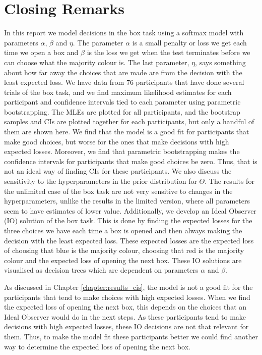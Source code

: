 \chapter{Closing Remarks}
In this report we model decisions in the box task using a softmax model with parameters $\alpha$, $\beta$ and $\eta$. The parameter $\alpha$ is a small penalty or loss we get each time we open a box and $\beta$ is the loss we get when the test terminates before we can choose what the majority colour is. The last parameter, $\eta$, says something about how far away the choices that are made are from the decision with the least expected loss.
We have data from 76 participants that have done several trials of the box task, and we find maximum likelihood estimates for each participant and confidence intervals tied to each parameter using parametric bootstrapping. The MLEs are plotted for all participants, and the bootstrap samples and CIs are plotted together for each participants, but only a handful of them are shown here. 
We find that the model is a good fit for participants that make good choices, but worse for the ones that make decisions with high expected losses. Moreover, we find that parametric bootstrapping makes the confidence intervals for participants that make good choices be zero. Thus, that is not an ideal way of finding CIs for these participants.
We also discuss the sensitivity to the hyperparameters in the prior distribution for $\Theta$. The results for the unlimited case of the box task are not very sensitive to changes in the hyperparameters, unlike the results in the limited version, where all parameters seem to have estimates of lower value. 
Additionally, we develop an Ideal Observer (IO) solution of the box task. This is done by finding the expected losses for the three choices we have each time a box is opened and then always making the decision with the least expected loss. These expected losses are the expected loss of choosing that blue is the majority colour, choosing that red is the majority colour and the expected loss of opening the next box. These IO solutions are visualised as decision trees which are dependent on parameters $\alpha$ and $\beta$.

As discussed in Chapter \ref{chapter:results_cis}, the model is not a good fit for the participants that tend to make choices with high expected losses. When we find the expected loss of opening the next box, this depends on the choices that an Ideal Observer would do in the next steps. As these participants tend to make decisions with high expected losses, these IO decisions are not that relevant for them. Thus, to make the model fit these participants better we could find another way to determine the expected loss of opening the next box. 

